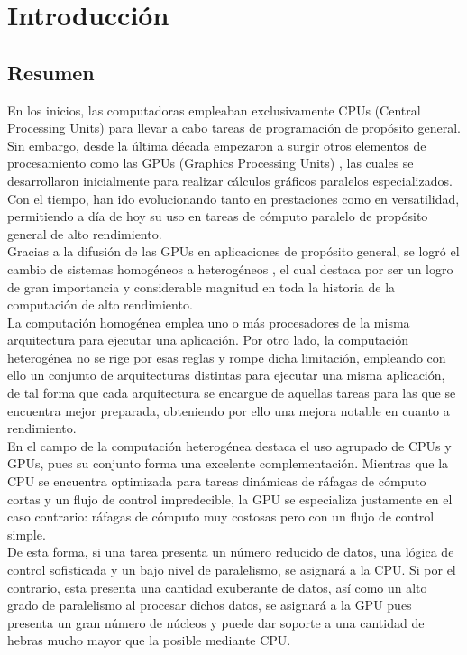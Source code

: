 \chapter{Introducción}

\section{Resumen}
En los inicios, las computadoras empleaban exclusivamente CPUs (Central Processing Units) \cite{CPU_definicion} para llevar a cabo tareas de programación de propósito general. Sin embargo, desde la última década empezaron a surgir otros elementos de procesamiento como las GPUs (Graphics Processing Units) \cite{GPU_definicion}, las cuales se desarrollaron inicialmente para realizar cálculos gráficos paralelos especializados. Con el tiempo, han ido evolucionando tanto en prestaciones como en versatilidad, permitiendo a día de hoy su uso en tareas de cómputo paralelo de propósito general de alto rendimiento. \\
Gracias a la difusión de las GPUs en aplicaciones de propósito general, se logró el cambio de sistemas homogéneos a heterogéneos \cite{sitemas_heterogeneo_definicion}, el cual destaca por ser un logro de gran importancia y considerable magnitud en toda la historia de la computación de alto rendimiento. \\
La computación homogénea emplea uno o más procesadores de la misma arquitectura para ejecutar una aplicación. Por otro lado, la computación heterogénea no se rige por esas reglas y rompe dicha limitación, empleando con ello un conjunto de arquitecturas distintas para ejecutar una misma aplicación, de tal forma que cada arquitectura se encargue de aquellas tareas para las que se encuentra mejor preparada, obteniendo por ello una mejora notable en cuanto a rendimiento. \\
En el campo de la computación heterogénea destaca el uso agrupado de CPUs y GPUs, pues su conjunto forma una excelente complementación. Mientras que la CPU se encuentra optimizada para tareas dinámicas de ráfagas de cómputo cortas y un flujo de control impredecible, la GPU se especializa justamente en el caso contrario: ráfagas de cómputo muy costosas pero con un flujo de control simple. \\
De esta forma, si una tarea presenta un número reducido de datos, una lógica de control sofisticada y un bajo nivel de paralelismo, se asignará a la CPU. Si por el contrario, esta presenta una cantidad exuberante de datos, así como un alto grado de paralelismo al procesar dichos datos, se asignará a la GPU pues presenta un gran número de núcleos y puede dar soporte a una cantidad de hebras mucho mayor que la posible mediante CPU. \cite{Professional_CUDA_C} \\
